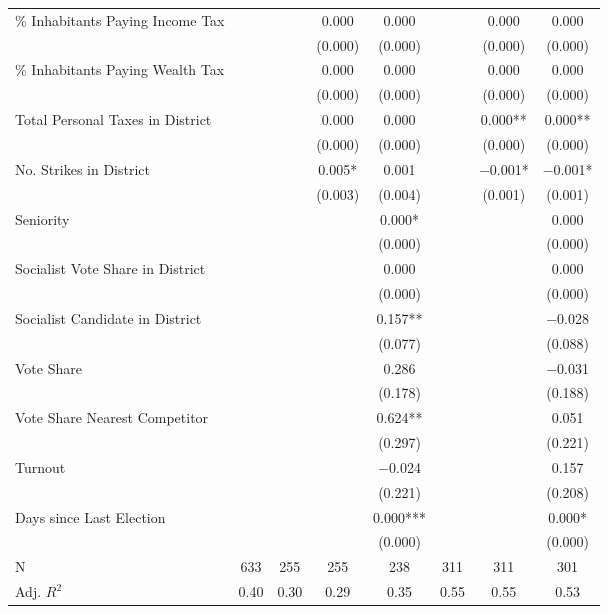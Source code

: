 \begin{table}[!h]
{\begin{threeparttable}
\begin{tabular}[t]{lccccccc}
\% Inhabitants Paying Income Tax &  &  & \num{0.000} & \num{0.000} &  & \num{0.000} & \num{0.000}\\
 &  &  & (\num{0.000}) & (\num{0.000}) &  & (\num{0.000}) & \vphantom{2} (\num{0.000})\\
\% Inhabitants Paying Wealth Tax &  &  & \num{0.000} & \num{0.000} &  & \num{0.000} & \num{0.000}\\
 &  &  & (\num{0.000}) & (\num{0.000}) &  & (\num{0.000}) & \vphantom{1} (\num{0.000})\\
Total Personal Taxes in District &  &  & \num{0.000} & \num{0.000} &  & \num{0.000}** & \num{0.000}**\\
 &  &  & (\num{0.000}) & (\num{0.000}) &  & (\num{0.000}) & (\num{0.000})\\
No. Strikes in District &  &  & \num{0.005}* & \num{0.001} &  & \num{-0.001}* & \num{-0.001}*\\
 &  &  & (\num{0.003}) & (\num{0.004}) &  & (\num{0.001}) & (\num{0.001})\\
Seniority &  &  &  & \num{0.000}* &  &  & \num{0.000}\\
 &  &  &  & (\num{0.000}) &  &  & \vphantom{2} (\num{0.000})\\
Socialist Vote Share in District &  &  &  & \num{0.000} &  &  & \num{0.000}\\
 &  &  &  & (\num{0.000}) &  &  & \vphantom{1} (\num{0.000})\\
Socialist Candidate in District &  &  &  & \num{0.157}** &  &  & \num{-0.028}\\
 &  &  &  & (\num{0.077}) &  &  & (\num{0.088})\\
Vote Share &  &  &  & \num{0.286} &  &  & \num{-0.031}\\
 &  &  &  & (\num{0.178}) &  &  & (\num{0.188})\\
Vote Share Nearest Competitor &  &  &  & \num{0.624}** &  &  & \num{0.051}\\
 &  &  &  & (\num{0.297}) &  &  & (\num{0.221})\\
Turnout &  &  &  & \num{-0.024} &  &  & \num{0.157}\\
 &  &  &  & (\num{0.221}) &  &  & (\num{0.208})\\
Days since Last Election &  &  &  & \num{0.000}*** &  &  & \num{0.000}*\\
 &  &  &  & (\num{0.000}) &  &  & (\num{0.000})\\
\midrule
N & \num{633} & \num{255} & \num{255} & \num{238} & \num{311} & \num{311} & \num{301}\\
Adj. $R^2$ & \num{0.40} & \num{0.30} & \num{0.29} & \num{0.35} & \num{0.55} & \num{0.55} & \num{0.53}\\

\end{tabular}
\end{threeparttable}}
\end{table}
